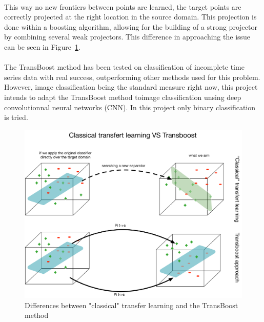 \documentclass[11 pt]{article}
\begin{document}
\paragraph{} This way no new frontiers between points are learned, the target points are correctly projected at the right location in the source domain. This projection is done within a boosting algorithm, allowing for the building of a strong projector by combining several weak projectors. This difference in approaching the issue can be seen in Figure~\ref{figDiff}. 


\paragraph{}The TransBoost method has been tested on classification of incomplete time series data with real success, outperforming other methods used for this problem. However, image classification being the standard measure right now, this project intends to adapt the TransBoost method toimage classification unsing deep convolutionnal neural networks (CNN). In this project only binary classification is tried.

\begin{figure}[H]
  \includegraphics[width=\textwidth]{fig2.pdf}
\caption{Differences between "classical" transfer learning and the TransBoost method}
  \label{figDiff}
\end{figure}
\end{document}
